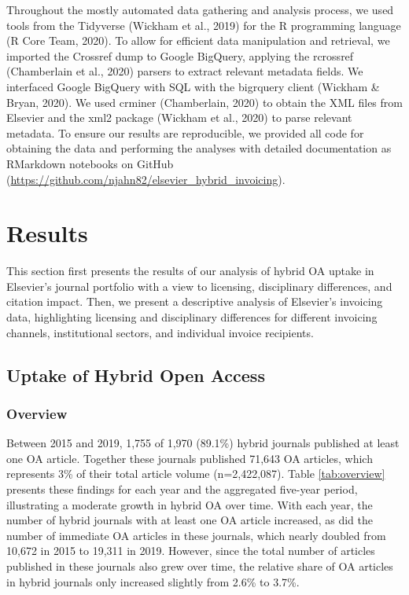 \documentclass[a4paper,man,floatsintext,longtable,noextraspace,12pt]{apa6}
\begin{document}
Throughout the mostly automated data gathering and analysis process, we
used tools from the Tidyverse (Wickham et al., 2019) for the R
programming language (R Core Team, 2020). To allow for efficient data
manipulation and retrieval, we imported the Crossref dump to Google
BigQuery, applying the rcrossref (Chamberlain et al., 2020) parsers to
extract relevant metadata fields. We interfaced Google BigQuery with SQL
with the bigrquery client (Wickham \& Bryan, 2020). We used crminer
(Chamberlain, 2020) to obtain the XML files from Elsevier and the xml2
package (Wickham et al., 2020) to parse relevant metadata. To ensure our
results are reproducible, we provided all code for obtaining the data
and performing the analyses with detailed documentation as RMarkdown
notebooks on GitHub
(\url{https://github.com/njahn82/elsevier_hybrid_invoicing}).

\hypertarget{results}{%
\section*{Results}\label{results}}

This section first presents the results of our analysis of hybrid OA
uptake in Elsevier's journal portfolio with a view to licensing,
disciplinary differences, and citation impact. Then, we present a
descriptive analysis of Elsevier's invoicing data, highlighting
licensing and disciplinary differences for different invoicing channels,
institutional sectors, and individual invoice recipients.

\hypertarget{uptake-of-hybrid-open-access}{%
\subsection*{Uptake of Hybrid Open
Access}\label{uptake-of-hybrid-open-access}}

\hypertarget{overview}{%
\subsubsection*{Overview}\label{overview}}

Between 2015 and 2019, 1,755 of 1,970 (89.1\%) hybrid journals published
at least one OA article. Together these journals published 71,643 OA
articles, which represents 3\% of their total article volume
(n=2,422,087). Table \ref{tab:overview} presents these findings for each
year and the aggregated five-year period, illustrating a moderate growth
in hybrid OA over time. With each year, the number of hybrid journals
with at least one OA article increased, as did the number of immediate
OA articles in these journals, which nearly doubled from 10,672 in 2015
to 19,311 in 2019. However, since the total number of articles published
in these journals also grew over time, the relative share of OA articles
in hybrid journals only increased slightly from 2.6\% to 3.7\%.
\end{document}

